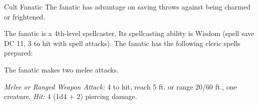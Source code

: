 \documentclass[10pt,a4paper,twoside,bg=print,twocolumn,openany,nodeprecatedcode]{dndbook}
\begin{document}
\begin{DndMonster}[float=t]{Cult Fanatic}
\DndMonsterBasics[
armor-class = {13 (\textit{leather armor})},
hit-points = {\DndDice{6d8 + 6}},
speed = {30 ft.}
]
\DndMonsterAbilityScores[
 str = 11,
 dex = 14,
 con = 12,
 int = 10,
 wis = 13,
 cha = 14
]
\DndMonsterDetails[
skills = {Deception +4, Persuasion +4, Religion +2},
languages = {any one language (usually Common)},
challenge = 2,
]
The fanatic has advantage on saving throws against being charmed or frightened.

The fanatic is a 4th-level spellcaster. Its spellcasting ability is Wisdom (spell save DC 11, 3 to hit with spell attacks). The fanatic has the following cleric spells prepared:
\begin{DndMonsterSpells}
\end{DndMonsterSpells}
The fanatic makes two melee attacks.

\textsl{Melee or Ranged Weapon Attack:} 4 to hit, reach 5 ft. or range 20/60 ft., one creature. \textsl{Hit:} 4 (1d4 + 2) piercing damage.

\end{DndMonster}
\end{document}
